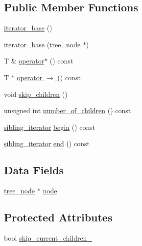 \subsection*{Public Member Functions}
\begin{CompactItemize}
\item 
\hyperlink{classtree_1_1iterator__base_1be2e6802acca5f281ddc7e5d67bd61c}{iterator\_\-base} ()
\item 
\hyperlink{classtree_1_1iterator__base_dd6dda19c2febebabbc5e769365dc4dd}{iterator\_\-base} (\hyperlink{classtree__node__}{tree\_\-node} $\ast$)
\item 
T \& \hyperlink{classtree_1_1iterator__base_2706c00219d33faae9edb1a13d132608}{operator$\ast$} () const 
\item 
T $\ast$ \hyperlink{classtree_1_1iterator__base_bd9c59569df7d8be5a50c835c180f4dc}{operator $\rightarrow$ } () const 
\item 
void \hyperlink{classtree_1_1iterator__base_a0be7989b9dd4c5bcdcc0d47a56d11fb}{skip\_\-children} ()
\item 
unsigned int \hyperlink{classtree_1_1iterator__base_435004214270928d106dd4c8f6a36f17}{number\_\-of\_\-children} () const 
\item 
\hyperlink{classtree_1_1sibling__iterator}{sibling\_\-iterator} \hyperlink{classtree_1_1iterator__base_7fad2f6cc1a6a667b5c71bb16c9b84e5}{begin} () const 
\item 
\hyperlink{classtree_1_1sibling__iterator}{sibling\_\-iterator} \hyperlink{classtree_1_1iterator__base_399dabd62f0659c02bfda59b26bdeefe}{end} () const 
\end{CompactItemize}
\subsection*{Data Fields}
\begin{CompactItemize}
\item 
\hyperlink{classtree__node__}{tree\_\-node} $\ast$ \hyperlink{classtree_1_1iterator__base_8e012d9505968cd1b51afab5bb4f2bf0}{node}
\end{CompactItemize}
\subsection*{Protected Attributes}
\begin{CompactItemize}
\item 
bool \hyperlink{classtree_1_1iterator__base_88239267268c728952e0cd89b9326e82}{skip\_\-current\_\-children\_\-}
\end{CompactItemize}
